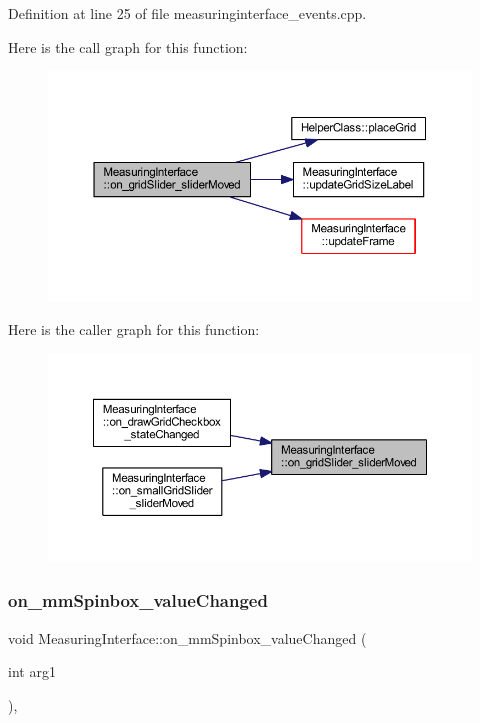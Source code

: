 Definition at line 25 of file measuringinterface\+\_\+events.\+cpp.

Here is the call graph for this function\+:
\nopagebreak
\begin{figure}[H]
\begin{center}
\leavevmode
\includegraphics[width=350pt]{class_measuring_interface_a5f9322ce550b248eeac9cf9cd35b6400_cgraph}
\end{center}
\end{figure}
Here is the caller graph for this function\+:
\nopagebreak
\begin{figure}[H]
\begin{center}
\leavevmode
\includegraphics[width=350pt]{class_measuring_interface_a5f9322ce550b248eeac9cf9cd35b6400_icgraph}
\end{center}
\end{figure}
\mbox{\label{class_measuring_interface_ac94cdc4a4e60d0910c499b5ed496790a}} 
\subsubsection{\texorpdfstring{on\_mmSpinbox\_valueChanged}{on\_mmSpinbox\_valueChanged}}
{\footnotesize\ttfamily void Measuring\+Interface\+::on\+\_\+mm\+Spinbox\+\_\+value\+Changed (\begin{DoxyParamCaption}\item[{int}]{arg1 }\end{DoxyParamCaption})\hspace{0.3cm}{\ttfamily [private]}, {\ttfamily [slot]}}



